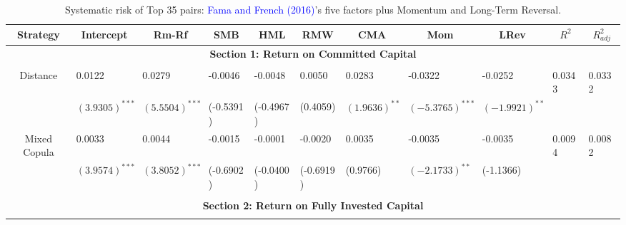 \documentclass[a4paper,12pt]{report}
\begin{document}
\begin{sidewaystable}
	\centering \scriptsize
	\caption{Systematic risk of Top 35 pairs: \textcolor{blue}{Fama and French} \textcolor{blue}{(2016)}'s five factors plus Momentum and Long-Term Reversal.}
	\begin{threeparttable}[H]
		\begin{tabularx}{\textwidth}{@{\extracolsep{\fill}} lllllllllll@{}}
			\toprule
			\multicolumn{1}{c}{Strategy} & \multicolumn{1}{c}{Intercept} &  \multicolumn{1}{c}{Rm-Rf} &  \multicolumn{1}{c}{SMB} &  \multicolumn{1}{c}{HML} &  \multicolumn{1}{c}{RMW} &  \multicolumn{1}{c}{CMA} & 
			\multicolumn{1}{c}{Mom} &  \multicolumn{1}{c}{LRev} &  \multicolumn{1}{c}{$R^{2}$} & \multicolumn{1}{c}{$R^{2}_{adj}$} \\
			\midrule
			\multicolumn{11}{c}{\textbf{Section 1: Return on Committed Capital}} \\
			\multicolumn{1}{c}{} & \multicolumn{1}{c}{} & \multicolumn{1}{c}{} & \multicolumn{1}{c}{} & \multicolumn{1}{c}{} & \multicolumn{1}{c}{} & \multicolumn{1}{c}{} & \multicolumn{1}{c}{} & \multicolumn{1}{c}{} & \multicolumn{1}{c}{} & \\
			\multicolumn{1}{c}{Distance} & 0.0122 & 0.0279 & -0.0046 & -0.0048 & 0.0050 & 0.0283 & -0.0322 & -0.0252 & 0.0343 & 0.0332 \\
			\multicolumn{1}{c}{} & $(3.9305)^{***}$ & $(5.5504)^{***}$ & (-0.5391) & (-0.4967) & (0.4059) & $(1.9636)^{**}$ & $(-5.3765)^{***}$ & $(-1.9921)^{**}$ & & \\
			\multicolumn{1}{c}{Mixed Copula} & 0.0033 & 0.0044 & -0.0015 & -0.0001 & -0.0020 & 0.0035 & -0.0035 & -0.0035 & 0.0094 & 0.0082 \\
			\multicolumn{1}{c}{} & $(3.9574)^{***}$ & $(3.8052)^{***}$ & (-0.6902) & (-0.0400) & (-0.6919) & (0.9766) & $(-2.1733)^{**}$ & (-1.1366) & & \\
			&       &       &       &       &       &       &       &       &       &       \\
			\midrule
			\multicolumn{11}{c}{\textbf{Section 2: Return on Fully Invested Capital}} \\
			&       &       &       &       &       &       &       &       &       &    \\
			

\end{tabularx}
\end{threeparttable}
\end{sidewaystable}
\end{document}
